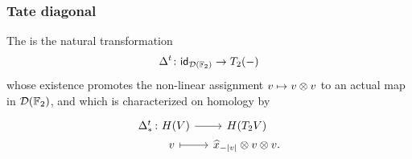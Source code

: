 \subsubsection{Tate diagonal}
\begin{definition}
The  is the natural transformation
\[
\Delta^t \colon \mathsf{id}_{\mathcal{D}({\mathbb{F}_2})} \to T_2(-)
\]
whose existence promotes the non-linear assignment \(v \mapsto v \otimes v\) to an actual map in \(\mathcal{D}({\mathbb{F}_2})\), and which is characterized on homology by
\[
\begin{tikzcd}[row sep=0, column sep=small]
	\Delta^t_* &[-20pt] \colon H(V) \arrow[r] & H(T_2V) \\
	& v \arrow[r, |->] & \widehat{x}_{-|v|} \ot v \ot v.
\end{tikzcd}
\]
\end{definition}
%
%
%
%
%

